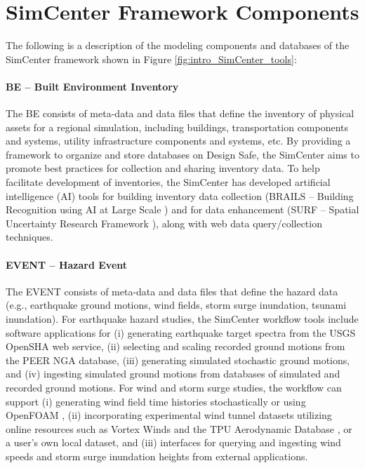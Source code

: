 \section{SimCenter Framework Components}

The following is a description of the modeling components and databases of the SimCenter framework shown in Figure \ref{fig:intro_SimCenter_tools}: 

\paragraph{BE – Built Environment Inventory} The BE consists of meta-data and data files that define the inventory of physical assets for a regional simulation, including buildings, transportation components and systems, utility infrastructure components and systems, etc.  By providing a framework to organize and store databases on Design Safe, the SimCenter aims to promote best practices for collection and sharing inventory data. To help facilitate development of inventories, the SimCenter has developed artificial intelligence (AI) tools for building inventory data collection (BRAILS – Building Recognition using AI at Large Scale ) and for data enhancement (SURF – Spatial Uncertainty Research Framework ), along with web data query/collection techniques. 

\paragraph{EVENT – Hazard Event} The EVENT consists of meta-data and data files that define the hazard data (e.g., earthquake ground motions, wind fields, storm surge inundation, tsunami inundation).  For earthquake hazard studies, the SimCenter workflow tools include software applications for (i) generating earthquake target spectra from the USGS OpenSHA web service, (ii) selecting and scaling recorded ground motions from the PEER NGA database, (iii) generating simulated stochastic ground motions, and (iv) ingesting simulated ground motions from databases of simulated and recorded ground motions.  For wind and storm surge studies, the workflow can support (i) generating wind field time histories stochastically or using OpenFOAM , (ii) incorporating experimental wind tunnel datasets utilizing online resources such as Vortex Winds \citep{kareem2017cyber} and the TPU Aerodynamic Database \citep{tpu2020tpu}, or a user’s own local dataset, and (iii) interfaces for querying and ingesting wind speeds and storm surge inundation heights from external applications.

